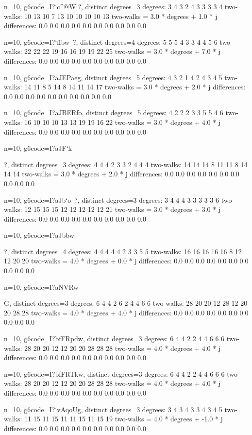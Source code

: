 {{{{{{{{{{{{n=10, g6code=I?`c^@W]?, distinct degrees=3
degrees: 3 4 3 2 4 3 3 3 3 4 
two-walks: 10 13 10 7 13 10 10 10 10 13 
two-walks = 3.0 * degrees + 1.0 * j
differences: 0.0 0.0 0.0 0.0 0.0 0.0 0.0 0.0 0.0 0.0 

n=10, g6code=I?`ffbw~?, distinct degrees=4
degrees: 5 5 5 4 3 3 4 4 5 6 
two-walks: 22 22 22 19 16 16 19 19 22 25 
two-walks = 3.0 * degrees + 7.0 * j
differences: 0.0 0.0 0.0 0.0 0.0 0.0 0.0 0.0 0.0 0.0 

n=10, g6code=I?aJEPaeg, distinct degrees=5
degrees: 4 3 2 1 4 2 4 3 4 5 
two-walks: 14 11 8 5 14 8 14 11 14 17 
two-walks = 3.0 * degrees + 2.0 * j
differences: 0.0 0.0 0.0 0.0 0.0 0.0 0.0 0.0 0.0 0.0 

n=10, g6code=I?aJBERfo, distinct degrees=5
degrees: 4 2 2 2 3 3 5 5 4 6 
two-walks: 16 10 10 10 13 13 19 19 16 22 
two-walks = 3.0 * degrees + 4.0 * j
differences: 0.0 0.0 0.0 0.0 0.0 0.0 0.0 0.0 0.0 0.0 

n=10, g6code=I?aJF`k{?, distinct degrees=3
degrees: 4 4 4 2 3 3 2 4 4 4 
two-walks: 14 14 14 8 11 11 8 14 14 14 
two-walks = 3.0 * degrees + 2.0 * j
differences: 0.0 0.0 0.0 0.0 0.0 0.0 0.0 0.0 0.0 0.0 

n=10, g6code=I?aJb`o~?, distinct degrees=3
degrees: 3 4 4 4 3 3 3 3 3 6 
two-walks: 12 15 15 15 12 12 12 12 12 21 
two-walks = 3.0 * degrees + 3.0 * j
differences: 0.0 0.0 0.0 0.0 0.0 0.0 0.0 0.0 0.0 0.0 

n=10, g6code=I?aJbbw}?, distinct degrees=4
degrees: 4 4 4 4 4 2 3 3 5 5 
two-walks: 16 16 16 16 16 8 12 12 20 20 
two-walks = 4.0 * degrees + 0.0 * j
differences: 0.0 0.0 0.0 0.0 0.0 0.0 0.0 0.0 0.0 0.0 

n=10, g6code=I?aNVRw}G, distinct degrees=3
degrees: 6 4 4 2 6 2 4 4 6 6 
two-walks: 28 20 20 12 28 12 20 20 28 28 
two-walks = 4.0 * degrees + 4.0 * j
differences: 0.0 0.0 0.0 0.0 0.0 0.0 0.0 0.0 0.0 0.0 

n=10, g6code=I?bfFRpdw, distinct degrees=3
degrees: 6 4 4 2 2 4 4 6 6 6 
two-walks: 28 20 20 12 12 20 20 28 28 28 
two-walks = 4.0 * degrees + 4.0 * j
differences: 0.0 0.0 0.0 0.0 0.0 0.0 0.0 0.0 0.0 0.0 

n=10, g6code=I?bfFRTkw, distinct degrees=3
degrees: 6 4 4 2 2 4 4 6 6 6 
two-walks: 28 20 20 12 12 20 20 28 28 28 
two-walks = 4.0 * degrees + 4.0 * j
differences: 0.0 0.0 0.0 0.0 0.0 0.0 0.0 0.0 0.0 0.0 

n=10, g6code=I?`vAqoUg, distinct degrees=3
degrees: 3 4 3 4 3 3 4 3 4 5 
two-walks: 11 15 11 15 11 11 15 11 15 19 
two-walks = 4.0 * degrees + -1.0 * j
differences: 0.0 0.0 0.0 0.0 0.0 0.0 0.0 0.0 0.0 0.0 

}}}}}}}}}}}
